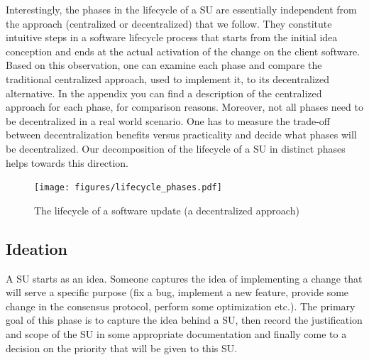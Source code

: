 Interestingly, the phases in the lifecycle of a SU are essentially independent from the approach (centralized or decentralized) that we follow. They constitute intuitive steps in a software lifecycle process that starts from the initial idea conception and ends at the actual activation of the change on the client software. Based on this observation, one can examine each phase and compare the traditional centralized approach, used to implement it, to its decentralized alternative. In the appendix you can find a description of the centralized approach for each phase, for comparison reasons. Moreover, not all phases need to be decentralized in a real world scenario. One has to measure the trade-off between decentralization benefits versus practicality and decide what phases will be decentralized. Our decomposition of the lifecycle of a SU in distinct phases helps towards this direction.

\begin{figure}[h!] %
    \caption{The lifecycle of a software update (a decentralized approach)}
    \centering
    \texttt{[image: figures/lifecycle\_phases.pdf]}
    \label{lifecycle}
\end{figure}

\subsection{Ideation}
A SU starts as an idea. Someone captures the idea of implementing a change that will serve a specific purpose (fix a bug, implement a new feature, provide some change in the consensus protocol, perform some optimization etc.). The primary goal of this phase is to capture the idea behind a SU, then record the justification and scope of the SU in some appropriate documentation and finally come to a decision on the priority that will be given to this SU. 



